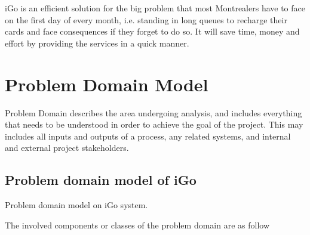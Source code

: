 \documentclass[a4paper,12pt]{article}
\begin{document}
iGo is an efficient solution for the big problem that most Montrealers have to face on the first day of every month, i.e. standing in long queues to recharge their cards and face consequences if they forget to do so. It will save time, money and effort by providing the services in a quick manner.

\newpage
\section {Problem Domain Model}
Problem Domain describes the area undergoing analysis, and includes everything that needs to be understood in order to achieve the goal of the project.  This may includes all inputs and outputs of a process, any related systems, and internal and external project stakeholders.
\subsection{Problem domain model of iGo}
\begin{center}
\caption{Problem domain model on iGo system.}
\end{center}
The involved components or classes of the problem domain are as follow
\end{document}
